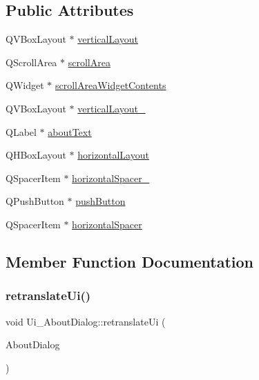 \subsection*{Public Attributes}
\begin{DoxyCompactItemize}
\item 
Q\+V\+Box\+Layout $\ast$ \mbox{\hyperlink{class_ui___about_dialog_ad9a707b99263cd8c14df8bc5ea562255}{vertical\+Layout}}
\item 
Q\+Scroll\+Area $\ast$ \mbox{\hyperlink{class_ui___about_dialog_aaeff2603f7d7cc5e746f345919147bd7}{scroll\+Area}}
\item 
Q\+Widget $\ast$ \mbox{\hyperlink{class_ui___about_dialog_a75a24d49d6152dff28e1d7bb0adb5360}{scroll\+Area\+Widget\+Contents}}
\item 
Q\+V\+Box\+Layout $\ast$ \mbox{\hyperlink{class_ui___about_dialog_a2d344108372e8a8c12011b83a7c18cd7}{vertical\+Layout\+\_}}
\item 
Q\+Label $\ast$ \mbox{\hyperlink{class_ui___about_dialog_a421e5f318f2ce185dddb3ad883a20d36}{about\+Text}}
\item 
Q\+H\+Box\+Layout $\ast$ \mbox{\hyperlink{class_ui___about_dialog_a560ba6910bb119c9bb23b61294398f3f}{horizontal\+Layout}}
\item 
Q\+Spacer\+Item $\ast$ \mbox{\hyperlink{class_ui___about_dialog_ae7a329086a5e9f76912ea9ed4c33348b}{horizontal\+Spacer\+\_}}
\item 
Q\+Push\+Button $\ast$ \mbox{\hyperlink{class_ui___about_dialog_a5aed72ca768d44de541c96772c5442d0}{push\+Button}}
\item 
Q\+Spacer\+Item $\ast$ \mbox{\hyperlink{class_ui___about_dialog_a4b1cbbf2e3c555bcb66f8afd27b8ceec}{horizontal\+Spacer}}
\end{DoxyCompactItemize}


\subsection{Member Function Documentation}
\mbox{\label{class_ui___about_dialog_a631c82f90dbffd49e4be4f1b4aa2a688}} 
\subsubsection{\texorpdfstring{retranslateUi()}{retranslateUi()}}
{\footnotesize\ttfamily void Ui\+\_\+\+About\+Dialog\+::retranslate\+Ui (\begin{DoxyParamCaption}\item[{Q\+Dialog $\ast$}]{About\+Dialog }\end{DoxyParamCaption})\hspace{0.3cm}{\ttfamily [inline]}}

